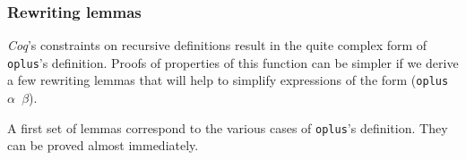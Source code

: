    \subsubsection{Rewriting lemmas}
    \label{sec:orgheadline86}

    \emph{Coq}'s constraints on recursive definitions result in 
    the quite  complex form of \texttt{oplus}'s definition.
    Proofs of properties of this function can be simpler if we
     derive a few  rewriting lemmas that will help to simplify 
    expressions of the form (\texttt{oplus $\alpha$ $\beta$}).

    A first set of lemmas correspond to the various cases of \texttt{oplus}'s 
    definition. They can be proved almost immediately.

    
    










